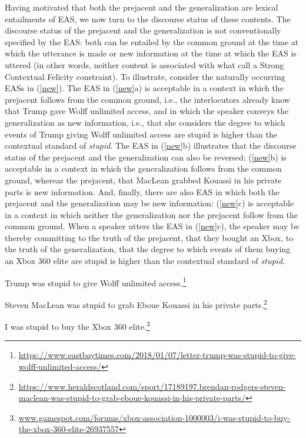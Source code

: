 \documentclass[11pt,fleqn]{article}
\newcommand{\6}{\mbox{$[\hspace*{-.6mm}[$}}
\newcommand{\9}{\mbox{$]\hspace*{-.6mm}]$}}
\begin{document}
Having motivated that both the prejacent and the generalization are lexical entailments of EAS, we now turn to the discourse status of these contents. The discourse status of the prejacent and the generalization is not conventionally specified by the EAS: both can be entailed by the common ground at the time at which the utterance is made or new information at the time at which the EAS is uttered (in other words, neither content is associated with what \citealt{brst-lang11} call a Strong Contextual Felicity constraint). To illustrate, consider the naturally occurring EASs in (\ref{new}). The EAS in (\ref{new}a) is acceptable in a context in which the prejacent follows from the common ground, i.e., the interlocutors already know that Trump gave Wolff unlimited access, and in which the speaker conveys the generalization as new information, i.e., that she considers the degree to which events of Trump giving Wolff unlimited access are stupid is higher than the contextual standard of {\em stupid}. The EAS in (\ref{new}b) illustrates that the discourse status of the prejacent and the generalization can also be reversed: (\ref{new}b) is acceptable in a context in which the generalization follows from the common ground, whereas the prejacent, that MacLean grabbed Kouassi in his private parts is new information. And, finally, there are also EAS in which both the prejacent and the generalization may be new information: (\ref{new}c) is acceptable in a context in which neither the generalization nor the prejacent follow from the common ground. When a speaker utters the EAS in (\ref{new}c), the speaker may be thereby committing to the truth of the prejacent, that they bought an Xbox, to the truth of the generalization, that the degree to which events of them buying an Xbox 360 elite are stupid is higher than the contextual standard of {\em stupid}.

\begin{exe}
\ex\label{new} 

\begin{xlist} 

\ex Trump was stupid to give Wolff unlimited access.\footnote{\url{https://www.eastbaytimes.com/2018/01/07/letter-trump-was-stupid-to-give-wolff-unlimited-access/}}

\ex Steven MacLean was stupid to grab Eboue Kouassi in his private parts.\footnote{\tiny{\url{https://www.heraldscotland.com/sport/17189197.brendan-rodgers-steven-maclean-was-stupid-to-grab-eboue-kouassi-in-his-private-parts/}}}

\ex I was stupid to buy the Xbox 360 elite.\footnote{\url{www.gamespot.com/forums/xbox-association-1000003/i-was-stupid-to-buy-the-xbox-360-elite-26937557}}

\end{xlist}
\end{exe}
\end{document}
